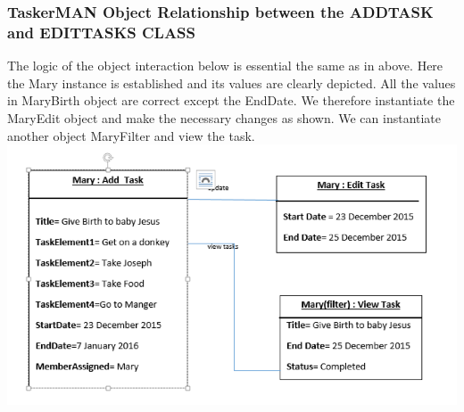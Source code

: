 \documentclass{project}
\begin{document}
\subsubsection{TaskerMAN Object Relationship between the ADD\textunderscore TASK and EDIT\textunderscore TASKS CLASS}
The logic of the object interaction below is essential the same as in above. Here the Mary instance is established and its values are clearly depicted.  All the values in MaryBirth object are correct except the EndDate.  We therefore instantiate the MaryEdit object and make the necessary changes as shown. We can instantiate another object MaryFilter and view the task. \\
\includegraphics[width=1\textwidth, center]{images/Detailed-Design/TaskerMANObjectDiagram2} \\
\end{document}
